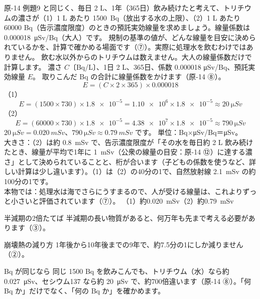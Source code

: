 \begin{phreidai}[処理水のトリチウムと規制の基準]\label{ph:原-16:ex4}
原-14 例題9 と同じく、毎日 2 L、1年（365日）飲み続けたと考えて、トリチウムの濃さが（1）1 L あたり \qty{1500}{Bq}（放出する水の上限）、（2）1 L あたり \num{60000} Bq（告示濃度限度）のときの預託実効線量を求めましょう。線量係数は \qty{0.000018}{\micro Sv}/Bq（大人）です。
\phbamen
規制の基準の値が、どんな線量を目安に決められているかを、計算で確かめる場面です（⑦）。実際に処理水を飲むわけではありません。
\phmushi
飲む水以外からのトリチウムは数えません。大人の線量係数だけで計算します。
\phzu
濃さ $C$〔Bq/L〕、1日 2 L、365日、係数 0.000018 \si{\micro Sv}/Bq、預託実効線量 $E$。
\phriyu
取りこんだ Bq の合計に線量係数をかけます（原-14 ⑧）。
\phtateru
\[ E=(C\times2\times365)\times0.000018 \]
\phtoku
（1）\[ E=(1500\times730)\times\num{1.8e-5}=\num{1.10e6}\times\num{1.8e-5}\approx\qty{20}{\micro Sv} \]
（2）\[ E=(60000\times730)\times\num{1.8e-5}=\num{4.38e7}\times\num{1.8e-5}\approx\qty{790}{\micro Sv} \]
$\qty{20}{\micro Sv}=\qty{0.020}{mSv}$、$\qty{790}{\micro Sv}\approx\qty{0.79}{mSv}$ です。
\phtashikame
単位：Bq×\si{\micro Sv}/Bq＝\si{\micro Sv}。\\
大きさ：（2）は約 \qty{0.8}{mSv} で、告示濃度限度が「その水を毎日約 2 L 飲み続けたとき、線量が平均で1年に \qty{1}{mSv}（公衆の線量の目安：原-14 ⑫）に達する濃さ」として決められていることと、桁が合います（子どもの係数を使うなど、詳しい計算は少し違います）。（1）は（2）の40分の1で、自然放射線 \qty{2.1}{mSv} の約100分の1です。\\
本物では：処理水は海でさらにうすまるので、人が受ける線量は、これよりずっと小さいと評価されています（⑦）。
\kotae （1）約\qty{0.020}{mSv}（2）約\qty{0.79}{mSv}
\end{phreidai}

\begin{tsumazuki}{半減期の2倍たてば}
半減期の長い物質があると、何万年も先まで考える必要があります（③）。
\end{tsumazuki}
\begin{tsumazuki}{崩壊熱の減り方}
1年後から10年後までの9年で、約7.5分の1にしか減りません（②）。
\end{tsumazuki}
\begin{tsumazuki}{Bq が同じなら}
同じ 1500 Bq を飲みこんでも、トリチウム（水）なら約 \qty{0.027}{\micro Sv}、セシウム137 なら約 \qty{20}{\micro Sv} で、約700倍違います（原-14 ⑧）。「何 Bq か」だけでなく、「何の Bq か」を確かめます。
\end{tsumazuki}

